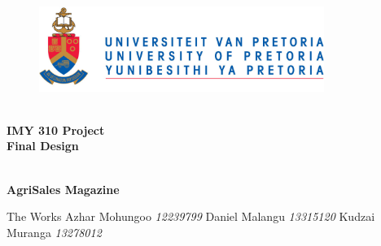 \begin{titlepage}
	\begin{center}
		
		\begin{figure}[t]
			\centering
			\includegraphics[width=350px]{../Images/UP_Logo.png}
		\end{figure}
		
		\textsc{\large } \\ 
		\vspace{2cm}
		\textbf{\Huge IMY 310 Project \\ [0.25cm]
			Final Design} \\ 

		\textsc{\large } \\ 
		\vspace{0.75cm}

		\textbf{\Large AgriSales Magazine} \\ 
		
		\begin{flushright} \large
			The Works \emph{} \newline
			\newline 
			Azhar Mohungoo \emph{12239799} \newline
			Daniel Malangu \emph{13315120} \newline
			Kudzai Muranga 	\emph{13278012} \newline
			\end{flushright}
		
	\end{center}
\end{titlepage}
